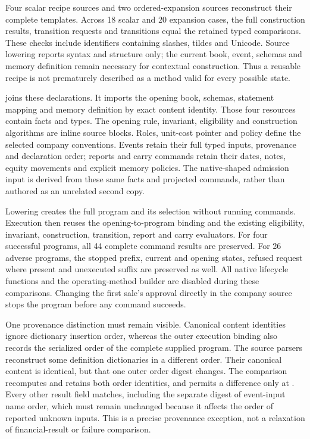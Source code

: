 Four scalar recipe sources and two ordered-expansion sources reconstruct their
complete templates. Across 18 scalar and 20 expansion cases, the full
construction results, transition requests and transitions equal the retained
typed comparisons. These checks include identifiers containing slashes, tildes
and Unicode. Source lowering reports syntax and structure only; the current
book, event, schemas and memory definition remain necessary for contextual
construction. Thus a reusable recipe is not prematurely described as a method
valid for every possible state.

 joins these declarations. It imports the opening
book, schemas, statement mapping and memory definition by exact content
identity. Those four resources contain facts and types. The opening rule,
invariant, eligibility and construction algorithms are inline source blocks.
Roles, unit-cost pointer and policy define the selected company conventions.
Events retain their full typed inputs, provenance and declaration order;
reports and carry commands retain their dates, notes, equity movements and
explicit memory policies. The native-shaped admission input is derived from
these same facts and projected commands, rather than authored as an unrelated
second copy.

Lowering creates the full program and its selection without running commands.
Execution then reuses the opening-to-program binding and the existing
eligibility, invariant, construction, transition, report and carry evaluators.
For four successful programs, all 44 complete command results are preserved.
For 26 adverse programs, the stopped prefix, current and opening states,
refused request where present and unexecuted suffix are preserved as well.
All native lifecycle functions and the operating-method builder are disabled
during these comparisons. Changing the first sale's approval directly in the
company source stops the program before any command succeeds.

One provenance distinction must remain visible. Canonical content identities
ignore dictionary insertion order, whereas the outer execution binding also
records the serialized order of the complete supplied program. The source
parsers reconstruct some definition dictionaries in a different order. Their
canonical content is identical, but that one outer order digest changes. The
comparison recomputes and retains both order identities, and permits a
difference only at . Every other result field
matches, including the separate digest of event-input name order, which must
remain unchanged because it affects the order of reported unknown inputs.
This is a precise provenance exception, not a relaxation of financial-result
or failure comparison.


